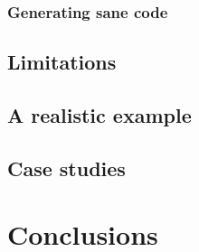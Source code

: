 \documentclass{article}
\begin{document}
\subsubsection{Generating sane code}

\subsection{Limitations}

\subsection{A realistic example}

\subsection{Case studies}

\section{Conclusions}
\end{document}
